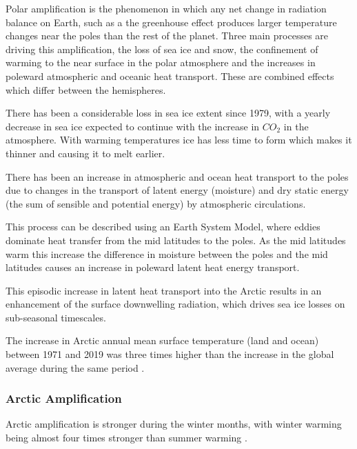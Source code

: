 \documentclass[11pt, oneside]{article}
\begin{document}
Polar amplification is the phenomenon in which any net change in radiation balance on Earth, such as a the greenhouse effect produces larger temperature changes near the poles than the rest of the planet. Three main processes are driving this amplification, the loss of sea ice and snow, the confinement of warming to the near surface in the polar atmosphere and the increases in poleward atmospheric and oceanic heat transport.   These are combined effects which differ between the hemispheres.

There has been a considerable loss in sea ice extent since 1979, with a yearly decrease in sea ice expected to continue with the increase in $CO_2$ in the atmosphere. With warming temperatures ice has less time to form which makes it thinner and causing it to melt earlier. 

There has been an increase in atmospheric and ocean heat transport to the poles due to changes in the transport of latent energy (moisture) and dry static energy (the sum of sensible and potential energy) by atmospheric circulations. 

This process can be described using an Earth System Model, where eddies dominate heat transfer from the mid latitudes to the poles. As the mid latitudes warm this increase the difference in moisture between the poles and the mid latitudes causes an increase in poleward latent heat energy transport. 

This episodic increase in latent heat transport into the Arctic results in an enhancement of the surface downwelling radiation, which drives sea ice losses on sub-seasonal timescales. 

The increase in Arctic annual mean surface temperature (land and
ocean) between 1971 and 2019 was three times
higher than the increase in the global average
during the same period \cite{AMAP}. 


\subsubsection{Arctic Amplification}
Arctic amplification is stronger during the winter months, with winter warming being almost four times stronger than summer warming \cite{bintanja2013changing}. 
\end{document}
